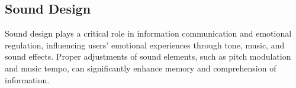 

\subsection{Sound Design}
Sound design plays a critical role in information communication and emotional regulation, influencing users’ emotional experiences through tone, music, and sound effects. Proper adjustments of sound elements, such as pitch modulation and music tempo, can significantly enhance memory and comprehension of information.



